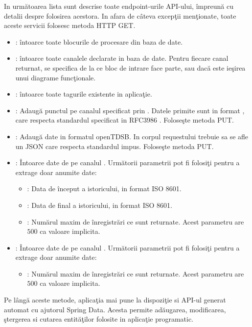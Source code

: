 In următoarea lista sunt descrise toate endpoint-urile API-ului, împreună cu detalii despre folosirea acestora. In afara de câteva excepţii menţionate, toate aceste servicii folosesc metoda HTTP GET.
\begin{itemize}
	\item {}: întoarce toate blocurile de procesare din baza de date. 
	\item {}: întoarce toate canalele declarate in baza de date. Pentru fiecare canal returnat, se specifica de la ce bloc de intrare face parte, sau dacă este ieşirea unui diagrame funcţionale.
	\item {}: întoarce toate tagurile existente in aplicaţie.
	\item {}: Adaugă punctul  pe canalul specificat prin . Datele primite sunt in format , care respecta standardul specificat in RFC3986 \autocite{rfc3986}. Foloseşte metoda PUT.
	\item {}: Adaugă date in formatul openTDSB\autocite{openTSDB}. In corpul requestului trebuie sa se afle un JSON care respecta standardul impus. Foloseşte metoda PUT.
	\item {}: Întoarce date de pe canalul . Următorii parametrii pot fi folosiţi pentru a extrage doar anumite date:
	\begin{itemize}
		\item {}: Data de început a istoricului, in format ISO 8601.
		\item {}: Data de final a istoricului, in format ISO 8601.
		\item {}: Numărul maxim de înregistrări ce sunt returnate. Acest parametru are $500$ ca valoare implicita.
	\end{itemize}
	\item {}: Întoarce date de pe canalul . Următorii parametrii pot fi folosiţi pentru a extrage doar anumite date:
	\begin{itemize}
		\item {}: Numărul maxim de înregistrări ce sunt returnate. Acest parametru are $500$ ca valoare implicita.
	\end{itemize}
\end{itemize}
Pe lângă aceste metode, aplicaţia mai pune la dispoziţie si API-ul generat automat cu ajutorul Spring Data. Acesta permite adăugarea, modificarea, ştergerea si cutarea entităţilor folosite in aplicaţie programatic.

